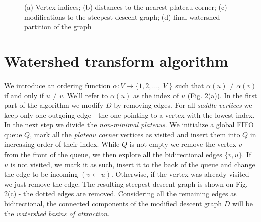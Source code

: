\documentclass[10pt, conference, compsocconf]{IEEEtran}
\begin{document}
\begin{figure}

  \protect\caption{(a) Vertex indices; (b) distances to the nearest
    plateau corner; (c) modifications to the steepest descent graph;
    (d) final watershed partition of the graph}
\end{figure}


\section{Watershed transform algorithm}

 We introduce an ordering function $\alpha:V\to\{1,2,...,|V|\}$ such
 that $\alpha(u)\neq\alpha(v)$ if and only if $u\neq v$. We'll refer
 to $\alpha(u)$ as the index of $u$ (Fig. 2(a)). In the first part of
 the algorithm we modify $D$ by removing edges. For all \emph{saddle
   vertices} we keep only one outgoing edge - the one pointing to a
 vertex with the lowest index. In the next step we divide the
 \emph{non-minimal plateaus}. We initialize a global FIFO queue $Q$,
 mark all the \emph{plateau corner} vertices as visited and insert
 them into $Q$ in increasing order of their index. While $Q$ is not
 empty we remove the vertex $v$ from the front of the queue, we then
 explore all the bidirectional edges $\{v,u\}$. If $u$ is not visited,
 we mark it as such, insert it to the back of the queue and change the
 edge to be incoming $(v\leftarrow u)$. Otherwise, if the vertex was
 already visited we just remove the edge. The resulting steepest
 descent graph is shown on Fig. 2(c) - the dotted edges are
 removed. Considering all the remaining edges as bidirectional, the
 connected components of the modified descent graph $D$ will be the
 \emph{watershed} \emph{basins of attraction}.
\end{document}
